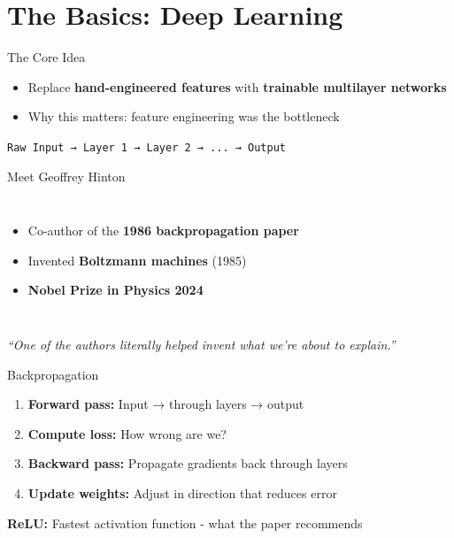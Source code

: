 \section{The Basics: Deep Learning}

\begin{frame}{The Core Idea}
    \begin{itemize}
        \item Replace \textbf{hand-engineered features} with \textbf{trainable multilayer networks}
        \item Why this matters: feature engineering was the bottleneck
    \end{itemize}
    
    \vspace{1em}
    \begin{center}
        \texttt{Raw Input → Layer 1 → Layer 2 → ... → Output}
    \end{center}
\end{frame}

\begin{frame}{Meet Geoffrey Hinton}
    \begin{columns}
        
        \begin{itemize}
            \item Co-author of the \textbf{1986 backpropagation paper}
            \item Invented \textbf{Boltzmann machines} (1985)
            \item \textbf{Nobel Prize in Physics 2024}
        \end{itemize}
    \end{columns}
    
    \vspace{1em}
    \textit{``One of the authors literally helped invent what we're about to explain.''}
\end{frame}

\begin{frame}{Backpropagation}
    
    \begin{enumerate}
        \item \textbf{Forward pass:} Input → through layers → output
        \item \textbf{Compute loss:} How wrong are we?
        \item \textbf{Backward pass:} Propagate gradients back through layers
        \item \textbf{Update weights:} Adjust in direction that reduces error
    \end{enumerate}
    
    \vspace{1em}
    \textbf{ReLU:} Fastest activation function - what the paper recommends
    
\end{frame}

